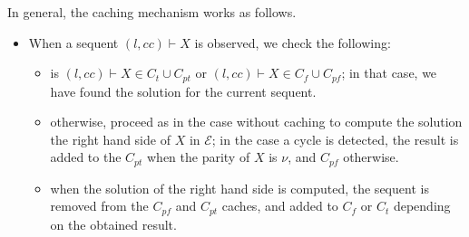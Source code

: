 \documentclass{article}
\newcommand{\loc}{l}
\newcommand{\region}{\mathit{cc}}
\begin{document}
In general, the caching mechanism works as follows.
\begin{itemize}
  \item When a sequent $(\loc, \region) \vdash X$ is observed, we check the following:
  \begin{itemize}
    \item is $(\loc, \region) \vdash X \in C_{t} \cup C_{pt}$ or $(\loc, \region) \vdash X \in C_{f} \cup C_{pf}$; in that case, we have found the solution for the current sequent.
    \item otherwise, proceed as in the case without caching to compute the solution the right hand side of $X$ in $\mathcal{E}$; in the case a cycle is detected, the result is added to the $C_{pt}$ when the parity of $X$ is $\nu$, and $C_{pf}$ otherwise.
    \item when the solution of the right hand side is computed, the sequent is removed from the $C_{pf}$ and $C_{pt}$ caches, and added to $C_f$ or $C_t$ depending on the obtained result.
  \end{itemize}
\end{itemize}
\end{document}
